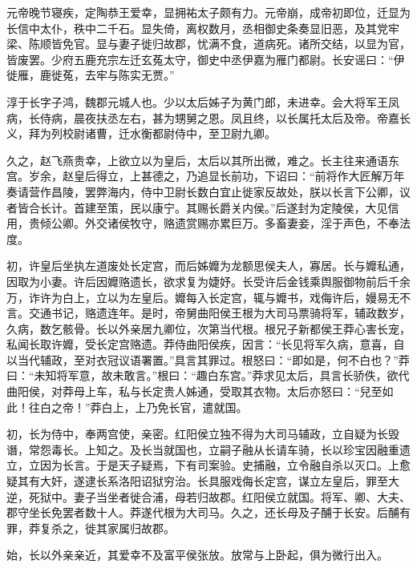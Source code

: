 \documentclass[12pt,UTF8]{ctexbook}
\begin{document}
元帝晚节寝疾，定陶恭王爱幸，显拥祐太子颇有力。元帝崩，成帝初即位，迁显为长信中太仆，秩中二千石。显失倚，离权数月，丞相御史条奏显旧恶，及其党牢梁、陈顺皆免官。显与妻子徙归故郡，忧满不食，道病死。诸所交结，以显为官，皆废罢。少府五鹿充宗左迁玄菟太守，御史中丞伊嘉为雁门都尉。长安谣曰：“伊徙雁，鹿徙菟，去牢与陈实无贾。”



淳于长字子鸿，魏郡元城人也。少以太后姊子为黄门郎，未进幸。会大将军王凤病，长侍病，晨夜扶丞左右，甚为甥舅之恩。凤且终，以长属托太后及帝。帝嘉长义，拜为列校尉诸曹，迁水衡都尉侍中，至卫尉九卿。



久之，赵飞燕贵幸，上欲立以为皇后，太后以其所出微，难之。长主往来通语东宫。岁余，赵皇后得立，上甚德之，乃追显长前功，下诏曰：“前将作大匠解万年奏请营作昌陵，罢弊海内，侍中卫尉长数白宜止徙家反故处，朕以长言下公卿，议者皆合长计。首建至策，民以康宁。其赐长爵关内侯。”后遂封为定陵侯，大见信用，贵倾公卿。外交诸侯牧守，赂遗赏赐亦累巨万。多畜妻妾，淫于声色，不奉法度。



初，许皇后坐执左道废处长定宫，而后姊孊为龙额思侯夫人，寡居。长与孊私通，因取为小妻。许后因孊赂遗长，欲求复为婕妤。长受许后金钱乘舆服御物前后千余万，诈许为白上，立以为左皇后。孊每入长定宫，辄与孊书，戏侮许后，嫚易无不言。交通书记，赂遗连年。是时，帝舅曲阳侯王根为大司马票骑将军，辅政数岁，久病，数乞骸骨。长以外亲居九卿位，次第当代根。根兄子新都侯王莽心害长宠，私闻长取许孊，受长定宫赂遗。莽侍曲阳侯疾，因言：“长见将军久病，意喜，自以当代辅政，至对衣冠议语署置。”具言其罪过。根怒曰：“即如是，何不白也？”莽曰：“未知将军意，故未敢言。”根曰：“趣白东宫。”莽求见太后，具言长骄佚，欲代曲阳侯，对莽母上车，私与长定贵人姊通，受取其衣物。太后亦怒曰：“兒至如此！往白之帝！”莽白上，上乃免长官，遣就国。



初，长为侍中，奉两宫使，亲密。红阳侯立独不得为大司马辅政，立自疑为长毁谮，常怨毒长。上知之。及长当就国也，立嗣子融从长请车骑，长以珍宝因融重遗立，立因为长言。于是天子疑焉，下有司案验。史捕融，立令融自杀以灭口。上愈疑其有大奸，遂逮长系洛阳诏狱穷治。长具服戏侮长定宫，谋立左皇后，罪至大逆，死狱中。妻子当坐者徙合浦，母若归故郡。红阳侯立就国。将军、卿、大夫、郡守坐长免罢者数十人。莽遂代根为大司马。久之，还长母及子酺于长安。后酺有罪，莽复杀之，徙其家属归故郡。



始，长以外亲亲近，其爱幸不及富平侯张放。放常与上卧起，俱为微行出入。
\end{document}
